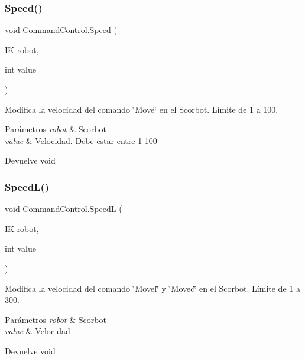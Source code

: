 \subsubsection{\texorpdfstring{Speed()}{Speed()}}
{\footnotesize\ttfamily void Command\+Control.\+Speed (\begin{DoxyParamCaption}\item[{\mbox{\hyperlink{class_i_k}{IK}}}]{robot,  }\item[{int}]{value }\end{DoxyParamCaption})\hspace{0.3cm}{\ttfamily [inline]}}

Modifica la velocidad del comando \char`\"{}\+Move\char`\"{} en el Scorbot. Límite de 1 a 100. 
\begin{DoxyParams}{Parámetros}
{\em robot} & Scorbot \\
\hline
{\em value} & Velocidad. Debe estar entre 1-\/100 \\
\hline
\end{DoxyParams}
\begin{DoxyReturn}{Devuelve}
void 
\end{DoxyReturn}
\mbox{\label{class_command_control_a05bef86b53aac0d93fea4c255dbe5f86}} 
\subsubsection{\texorpdfstring{SpeedL()}{SpeedL()}}
{\footnotesize\ttfamily void Command\+Control.\+SpeedL (\begin{DoxyParamCaption}\item[{\mbox{\hyperlink{class_i_k}{IK}}}]{robot,  }\item[{int}]{value }\end{DoxyParamCaption})\hspace{0.3cm}{\ttfamily [inline]}}

Modifica la velocidad del comando \char`\"{}\+Movel\char`\"{} y \char`\"{}\+Movec\char`\"{} en el Scorbot. Límite de 1 a 300. 
\begin{DoxyParams}{Parámetros}
{\em robot} & Scorbot \\
\hline
{\em value} & Velocidad \\
\hline
\end{DoxyParams}
\begin{DoxyReturn}{Devuelve}
void 
\end{DoxyReturn}
\mbox{\label{class_command_control_a69ae96214c4e9cd5f8d3ded57cfe9ba3}} 
